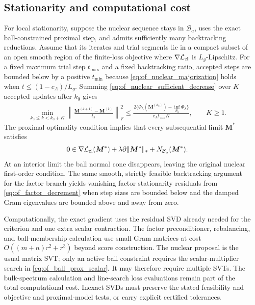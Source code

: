 \documentclass[numsec,webpdf,modern,large,namedate]{oup-authoring-template}
\theoremstyle{plain}
\theoremstyle{remark}
\newcommand{\M}{\bm{M}}
\newif\ifmarkchanges
\newenvironment{revision}{\begingroup\ifmarkchanges\color{red}\fi}{\endgroup}
\begin{document}
\begin{revision}
\subsection{Stationarity and computational cost}
\label{sec:stationarity_cost}
For local stationarity, suppose the nuclear sequence stays in
$\mathcal B_a$, uses the exact ball-constrained proximal step, and admits
sufficiently many backtracking reductions. Assume that its iterates and
trial segments lie in a compact subset of an open smooth region of the
finite-loss objective where $\nabla\mathcal L_{\rm cl}$ is
$L_g$-Lipschitz.
For a fixed maximum trial step $t_{\max}$ and a fixed backtracking ratio,
accepted steps are bounded below by a positive
$t_{\min}$ because \eqref{eq:of_nuclear_majorization} holds when
$t\le(1-c_A)/L_g$. Summing
\eqref{eq:of_nuclear_sufficient_decrease} over $K$ accepted updates after $k_0$ gives
\begin{align}
 \min_{k_0\le k<k_0+K}\left\|\frac{\M^{(k+1)}-\M^{(k)}}{t_k}\right\|_F^2
 \le\frac{2\{\Phi_\lambda(\M^{(k_0)})-\inf_{\mathcal B_a}\Phi_\lambda\}}
 {c_A t_{\min}K},\qquad K\ge1.
 \label{eq:of_stationarity_complexity}
\end{align}
The proximal optimality condition implies that every subsequential limit $\M^\ast$ satisfies
\begin{align*}
 0\in\nabla\mathcal L_{\rm cl}(\M^\ast)
       +\lambda\partial\|\M^\ast\|_*
       +N_{\mathcal B_a}(\M^\ast).
\end{align*}
At an interior limit the ball normal cone disappears, leaving the original
nuclear first-order condition.  The same smooth, strictly feasible
backtracking argument for the factor branch yields vanishing factor
stationarity residuals from \eqref{eq:of_factor_decrement} when step sizes
are bounded below and the damped Gram eigenvalues are bounded above and
away from zero.

Computationally, the exact gradient uses the residual SVD already needed
for the criterion and one extra scalar contraction.  The factor
preconditioner, rebalancing, and ball-membership calculation use small Gram
matrices at cost $O((m+n)r^2+r^3)$ beyond score construction.  The nuclear
proposal is the usual matrix SVT; only an active ball constraint requires
the scalar-multiplier search in \eqref{eq:of_ball_prox_scalar}.  It may
therefore require multiple SVTs.
The bulk-spectrum calculation and line-search loss evaluations remain part
of the total computational cost.  Inexact SVDs must preserve the stated feasibility and
objective and proximal-model tests, or carry explicit certified tolerances.
\end{revision}
\end{document}
